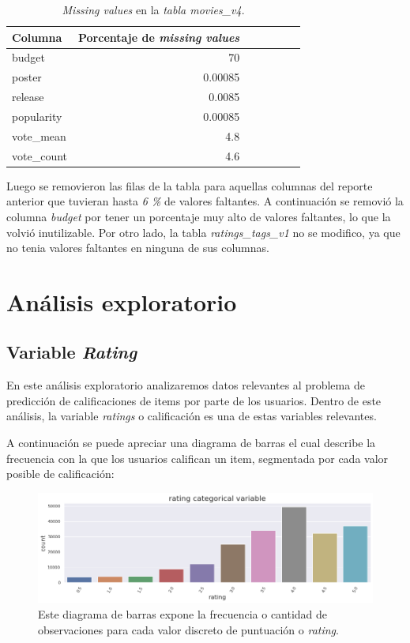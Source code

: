 \documentclass[11pt,a4paper,twoside]{thesis}
\begin{document}
\begin{table}[h!]
\centering
\footnotesize
\begin{tabular}{lrrrrrr}
\hline
Columna &  Porcentaje de \textit{missing values} \\
\hline
   	budget     &  70      \\
   	poster     &  0.00085 \\
   	release    &  0.0085  \\
	popularity &  0.00085 \\
	vote\_mean  &  4.8     \\
	vote\_count &  4.6     \\
\hline
\end{tabular}
\caption{\textit{Missing values} en la \textit{tabla movies\_v4}.}
\label{table:tab}
\end{table}

Luego se removieron las filas de la tabla para aquellas columnas del reporte anterior que tuvieran hasta \textit{6 \%} de valores faltantes. A continuación se removió la columna \textit{budget} por tener un porcentaje muy alto de valores faltantes, lo que la volvió inutilizable. Por otro lado, la tabla \textit{ratings\_tags\_v1} no se modifico, ya que no tenia valores faltantes en ninguna de sus columnas.


\clearpage


\section{Análisis exploratorio}


\subsection{Variable \textit{Rating}}


En este análisis exploratorio analizaremos datos relevantes al problema de predicción de calificaciones de items por parte de los usuarios. Dentro de este análisis, la variable \textit{ratings} o calificación es una de estas variables relevantes.

A continuación se puede apreciar una diagrama de barras el cual describe la frecuencia con la que los usuarios califican un item, segmentada por cada valor posible de calificación:


\begin{figure}[h!]
	\centering
	\includegraphics[width=15cm]{./images/rating-barplot.png}
	\caption{Este diagrama de barras expone la frecuencia o cantidad de observaciones para cada valor discreto de puntuación o \textit{rating}.}
	\label{fig:ratingsBarPlot}
\end{figure}
\end{document}
